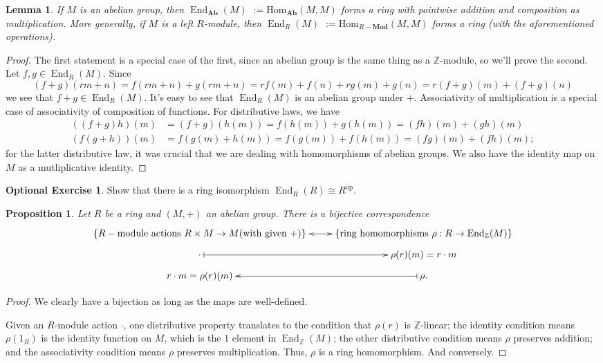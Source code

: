 \documentclass{amsart}[12pt]
\def\End{\operatorname{End}}
\newcommand{\Hom}{\mathrm{Hom}}
\newcommand{\Z}{\mathbb{Z}}
\newcommand{\Def}[1]{#1 \index{#1}}
\numberwithin{equation}{section}
\theoremstyle{plain} %
\newtheorem{lem}[equation]{Lemma}
\newtheorem{prop}[equation]{Proposition}
\theoremstyle{definition}
\newtheorem{exer}[equation]{Optional Exercise}
\theoremstyle{remark}
\newcommand{\Ab}{\mathbf{Ab}}
\newcommand{\Mod}[1]{#1-\mathbf{Mod}}
\begin{document}
\begin{lem}
If $M$ is an abelian group, then \Def{$\End_{\Ab}(M)$} $:=\Hom_{\Ab}(M,M)$ forms a ring with pointwise addition and composition as multiplication. More generally, if $M$ is a left $R$-module, then \Def{$\End_{R}(M)$}$:=\Hom_{\Mod{R}}(M,M)$ forms a ring (with the aforementioned operations).
\end{lem}
\begin{proof}
The first statement is a special case of the first, since an abelian group is the same thing as a $\Z$-module, so we'll prove the second. Let $f,g\in \End_R(M)$. Since 
  \[(f+g)(rm+n) = f(rm+n)+g(rm+n)= rf(m)+f(n) +rg(m)+g(n) = r(f+g)(m) + (f+g)(n)\]
we see that $f+g\in \End_{R}(M)$. It's easy to see that $\End_{R}(M)$ is an abelian group under $+$.
Associativity of multiplication is a special case of associativity of composition of functions. For distributive laws, we have
\[\begin{aligned} ((f+g)h) (m) &= (f+g)(h(m)) =f(h(m)) + g(h(m)) = (fh)(m) + (gh)(m) 
\\ (f(g+h)) (m) &= f(g(m)+h(m)) = f(g(m)) + f(h(m)) = (fg) (m) + (fh)(m);
\end{aligned}\]
for the latter distributive law, it was crucial that we are dealing with homomorphisms of abelian groups. We also have the identity map on $M$ as a mutliplicative identity.
\end{proof}


\begin{exer} Show that there is a ring isomorphism $\End_R(R) \cong R^{\mathrm{op}}$.
\end{exer}

\begin{prop}
Let $R$ be a ring and $(M, +)$  an abelian group. There is a bijective correspondence
\[ \xymatrix@R=.6em{ \{ R-\text{module actions} \ R \times M \to M \text{(with given +)} \}  \ar@{<->}[r] & \{ \text{ring homomorphisms} \ \rho: R \to \End_{\Z}(M) \}\\
\cdot  \ar@{|->}[r] & \rho(r)(m) = r\cdot m \\
r\cdot m = \rho(r)(m)  & \ar@{|->}[l] \rho.}
\]
\end{prop}
\begin{proof}
We clearly have a bijection as long as the maps are well-defined.

Given an $R$-module action $\cdot$, one distributive property translates to the condition that $\rho(r)$ is $\Z$-linear; the identity condition means $\rho(1_R)$ is the identity function on $M$, which is the $1$ element in $\End_\Z(M)$; the other distributive condition means $\rho$ preserves addition; and the associativity condition means $\rho$ preserves multiplication. Thus, $\rho$ is a ring homomorphism. And conversely. 
\end{proof}
\end{document}
